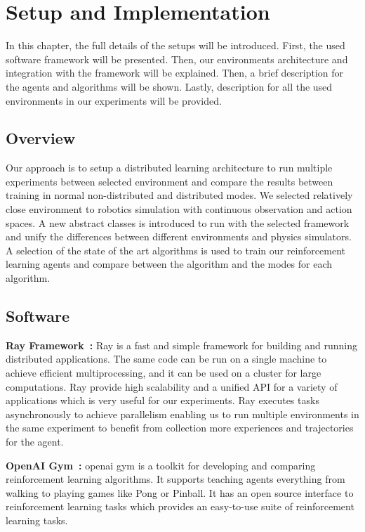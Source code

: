 
\chapter{Setup and Implementation}\label{chapter:setup_and_implementation}

In this chapter, the full details of the setups will be introduced. First, the used software framework will be presented. Then, our environments architecture and integration with the framework will be explained. Then, a brief description for the agents and algorithms will be shown. Lastly, description for all the used environments in our experiments will be provided.

\section{Overview}

Our approach is to setup a distributed learning architecture to run multiple experiments between selected environment and compare the results between training in normal non-distributed and distributed modes. We selected relatively close environment to robotics simulation with continuous observation and action spaces. A new abstract classes is introduced to run with the selected framework and unify the differences between different environments and physics simulators. A selection of the state of the art algorithms is used to train our reinforcement learning agents and compare between the algorithm and the modes for each algorithm.

\section{Software}
\textbf{Ray Framework~\parencite{moritz2018ray}: } Ray is a fast and simple framework for building and running distributed applications. The same code can be run on a single machine to achieve efficient multiprocessing, and it can be used on a cluster for large computations. Ray provide high scalability and a unified API for a variety of applications which is very useful for our experiments. Ray executes tasks asynchronously to achieve parallelism enabling us to run multiple environments in the same experiment to benefit from collection more experiences and trajectories for the agent.

\textbf{OpenAI Gym~\parencite{brockman2016openai}: } openai gym is a toolkit for developing and comparing reinforcement learning algorithms. It supports teaching agents everything from walking to playing games like Pong or Pinball. It has an open source interface to reinforcement learning tasks which provides an easy-to-use suite of reinforcement learning tasks. 

